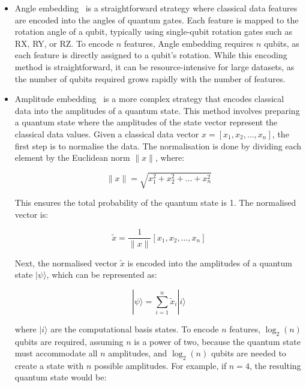 \begin{itemize}
  \item Angle embedding~\cite{schuld2021supervised} is a
    straightforward strategy where classical data features are
    encoded into the angles of quantum gates. Each feature is mapped
    to the rotation angle of a qubit, typically using single-qubit
    rotation gates such as RX, RY, or RZ. To encode \(n\) features,
    Angle embedding requires \(n\) qubits, as each feature is
    directly assigned to a qubit's rotation. While this encoding
    method is straightforward, it can be resource-intensive for large
    datasets, as the number of qubits required grows rapidly with the
    number of features.

  \item Amplitude embedding~\cite{schuld2021supervised} is a more
    complex strategy that encodes classical data into the amplitudes
    of a quantum state. This method involves preparing a quantum
    state where the amplitudes of the state vector represent the
    classical data values. Given a classical data vector \( x = [x_1,
    x_2, \dots, x_n] \), the first step is to normalise the data. The
    normalisation is done by dividing each element by the Euclidean
    norm \( \|x\| \), where:

    \begin{equation}
      \| x \| = \sqrt{x_1^2 + x_2^2 + \dots + x_n^2}
    \end{equation}

    This ensures the total probability of the quantum state is 1. The
    normalised vector is:

    \begin{equation}
      \tilde{x} = \frac{1}{\| x \|} [x_1, x_2, \dots, x_n]
    \end{equation}

    Next, the normalised vector \( \tilde{x} \) is encoded into the
    amplitudes of a quantum state \( |\psi \rangle \), which can be
    represented as:

    \begin{equation}
      |\psi \rangle = \sum_{i=1}^{n} \tilde{x}_i |i\rangle
    \end{equation}

    where \( |i\rangle \) are the computational basis states. To
    encode \( n \) features, \( \log_2(n) \) qubits are required,
    assuming \( n \) is a power of two, because the quantum state
    must accommodate all \( n \) amplitudes, and \( \log_2(n) \)
    qubits are needed to create a state with \( n \) possible
    amplitudes. For example, if \( n = 4 \), the resulting quantum
    state would be:


\end{itemize}
